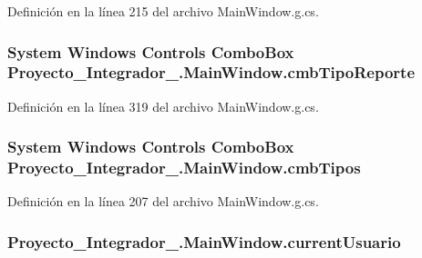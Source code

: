 Definición en la línea 215 del archivo Main\-Window.\-g.\-cs.

\hypertarget{class_proyecto___integrador__3_1_1_main_window_af005273fce43d170b199a3f487ab24cf}{
\subsubsection[{cmb\-Tipo\-Reporte}]{\setlength{\rightskip}{0pt plus 5cm}System Windows Controls Combo\-Box Proyecto\-\_\-\-Integrador\-\_.\-Main\-Window.\-cmb\-Tipo\-Reporte\hspace{0.3cm}{\ttfamily [package]}}}\label{class_proyecto___integrador__3_1_1_main_window_af005273fce43d170b199a3f487ab24cf}


Definición en la línea 319 del archivo Main\-Window.\-g.\-cs.

\hypertarget{class_proyecto___integrador__3_1_1_main_window_a6ffda9fa41aae566606ef782be37ed11}{
\subsubsection[{cmb\-Tipos}]{\setlength{\rightskip}{0pt plus 5cm}System Windows Controls Combo\-Box Proyecto\-\_\-\-Integrador\-\_.\-Main\-Window.\-cmb\-Tipos\hspace{0.3cm}{\ttfamily [package]}}}\label{class_proyecto___integrador__3_1_1_main_window_a6ffda9fa41aae566606ef782be37ed11}


Definición en la línea 207 del archivo Main\-Window.\-g.\-cs.

\hypertarget{class_proyecto___integrador__3_1_1_main_window_a14c72c878b871a5918157f933a638a6e}{
\subsubsection[{current\-Usuario}]{ Proyecto\-\_\-\-Integrador\-\_.\-Main\-Window.\-current\-Usuario\hspace{0.3cm}{\ttfamily [private]}}}\label{class_proyecto___integrador__3_1_1_main_window_a14c72c878b871a5918157f933a638a6e}


